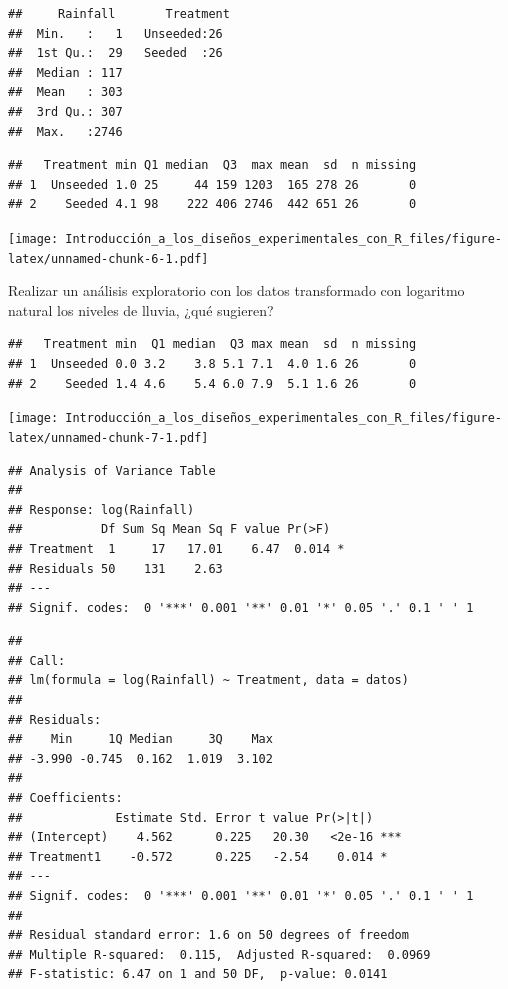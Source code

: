 \documentclass[]{book}
\begin{document}
\begin{verbatim}
##     Rainfall       Treatment 
##  Min.   :   1   Unseeded:26  
##  1st Qu.:  29   Seeded  :26  
##  Median : 117                
##  Mean   : 303                
##  3rd Qu.: 307                
##  Max.   :2746
\end{verbatim}

\begin{verbatim}
##   Treatment min Q1 median  Q3  max mean  sd  n missing
## 1  Unseeded 1.0 25     44 159 1203  165 278 26       0
## 2    Seeded 4.1 98    222 406 2746  442 651 26       0
\end{verbatim}

\texttt{[image: Introducción\_a\_los\_diseños\_experimentales\_con\_R\_files/figure-latex/unnamed-chunk-6-1.pdf]}

Realizar un análisis exploratorio con los datos transformado con
logaritmo natural los niveles de lluvia, ¿qué sugieren?

\begin{verbatim}
##   Treatment min  Q1 median  Q3 max mean  sd  n missing
## 1  Unseeded 0.0 3.2    3.8 5.1 7.1  4.0 1.6 26       0
## 2    Seeded 1.4 4.6    5.4 6.0 7.9  5.1 1.6 26       0
\end{verbatim}

\texttt{[image: Introducción\_a\_los\_diseños\_experimentales\_con\_R\_files/figure-latex/unnamed-chunk-7-1.pdf]}

\begin{verbatim}
## Analysis of Variance Table
## 
## Response: log(Rainfall)
##           Df Sum Sq Mean Sq F value Pr(>F)  
## Treatment  1     17   17.01    6.47  0.014 *
## Residuals 50    131    2.63                 
## ---
## Signif. codes:  0 '***' 0.001 '**' 0.01 '*' 0.05 '.' 0.1 ' ' 1
\end{verbatim}

\begin{verbatim}
## 
## Call:
## lm(formula = log(Rainfall) ~ Treatment, data = datos)
## 
## Residuals:
##    Min     1Q Median     3Q    Max 
## -3.990 -0.745  0.162  1.019  3.102 
## 
## Coefficients:
##             Estimate Std. Error t value Pr(>|t|)    
## (Intercept)    4.562      0.225   20.30   <2e-16 ***
## Treatment1    -0.572      0.225   -2.54    0.014 *  
## ---
## Signif. codes:  0 '***' 0.001 '**' 0.01 '*' 0.05 '.' 0.1 ' ' 1
## 
## Residual standard error: 1.6 on 50 degrees of freedom
## Multiple R-squared:  0.115,  Adjusted R-squared:  0.0969 
## F-statistic: 6.47 on 1 and 50 DF,  p-value: 0.0141
\end{verbatim}
\end{document}
